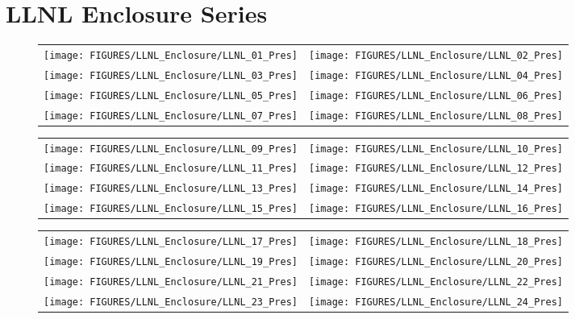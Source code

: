 \clearpage

\section{LLNL Enclosure Series}

\begin{figure}[p]
\begin{tabular*}{\textwidth}{l@{\extracolsep{\fill}}r}
\texttt{[image: FIGURES/LLNL\_Enclosure/LLNL\_01\_Pres]} &
\texttt{[image: FIGURES/LLNL\_Enclosure/LLNL\_02\_Pres]} \\
\texttt{[image: FIGURES/LLNL\_Enclosure/LLNL\_03\_Pres]} &
\texttt{[image: FIGURES/LLNL\_Enclosure/LLNL\_04\_Pres]} \\
\texttt{[image: FIGURES/LLNL\_Enclosure/LLNL\_05\_Pres]} &
\texttt{[image: FIGURES/LLNL\_Enclosure/LLNL\_06\_Pres]} \\
\texttt{[image: FIGURES/LLNL\_Enclosure/LLNL\_07\_Pres]} &
\texttt{[image: FIGURES/LLNL\_Enclosure/LLNL\_08\_Pres]}
\end{tabular*}
\label{LLNL_Enclosure_Pres_1}
\end{figure}

\begin{figure}[p]
\begin{tabular*}{\textwidth}{l@{\extracolsep{\fill}}r}
\texttt{[image: FIGURES/LLNL\_Enclosure/LLNL\_09\_Pres]} &
\texttt{[image: FIGURES/LLNL\_Enclosure/LLNL\_10\_Pres]} \\
\texttt{[image: FIGURES/LLNL\_Enclosure/LLNL\_11\_Pres]} &
\texttt{[image: FIGURES/LLNL\_Enclosure/LLNL\_12\_Pres]} \\
\texttt{[image: FIGURES/LLNL\_Enclosure/LLNL\_13\_Pres]} &
\texttt{[image: FIGURES/LLNL\_Enclosure/LLNL\_14\_Pres]} \\
\texttt{[image: FIGURES/LLNL\_Enclosure/LLNL\_15\_Pres]} &
\texttt{[image: FIGURES/LLNL\_Enclosure/LLNL\_16\_Pres]}
\end{tabular*}
\label{LLNL_Enclosure_Pres_2}
\end{figure}

\begin{figure}[p]
\begin{tabular*}{\textwidth}{l@{\extracolsep{\fill}}r}
\texttt{[image: FIGURES/LLNL\_Enclosure/LLNL\_17\_Pres]} &
\texttt{[image: FIGURES/LLNL\_Enclosure/LLNL\_18\_Pres]} \\
\texttt{[image: FIGURES/LLNL\_Enclosure/LLNL\_19\_Pres]} &
\texttt{[image: FIGURES/LLNL\_Enclosure/LLNL\_20\_Pres]} \\
\texttt{[image: FIGURES/LLNL\_Enclosure/LLNL\_21\_Pres]} &
\texttt{[image: FIGURES/LLNL\_Enclosure/LLNL\_22\_Pres]} \\
\texttt{[image: FIGURES/LLNL\_Enclosure/LLNL\_23\_Pres]} &
\texttt{[image: FIGURES/LLNL\_Enclosure/LLNL\_24\_Pres]}
\end{tabular*}
\label{LLNL_Enclosure_Pres_3}
\end{figure}

